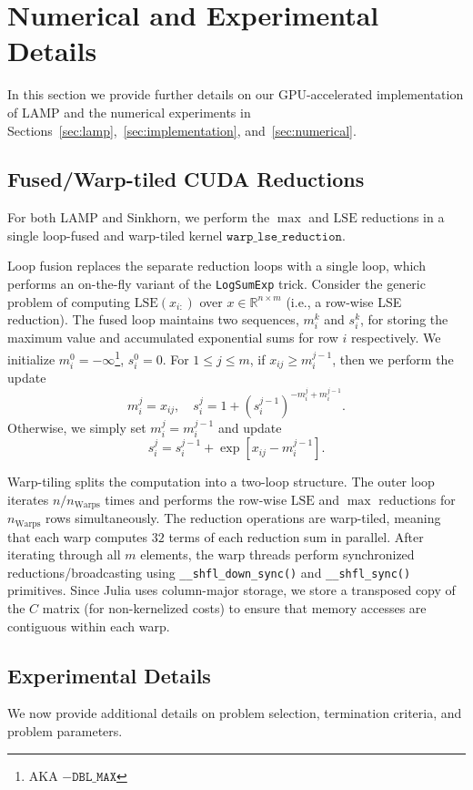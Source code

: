 \documentclass[10pt]{article}
\newcommand{\R}{\mathbb{R}}
\newcommand{\LSE}{\mathrm{LSE}}
\theoremstyle{plain}
\theoremstyle{definition}
\theoremstyle{remark}
\begin{document}
\section{Numerical and Experimental Details}\label{appdx:numerical}
In this section we provide further details on our GPU-accelerated implementation of LAMP and the numerical experiments in Sections~\ref{sec:lamp},~\ref{sec:implementation}, and~\ref{sec:numerical}.

\subsection{Fused/Warp-tiled CUDA Reductions}
For both LAMP and Sinkhorn, we perform the $\max$ and $\LSE$ reductions in a single loop-fused and warp-tiled kernel $\texttt{warp\_lse\_reduction}$. 

Loop fusion replaces the separate reduction loops with a single loop, which performs an on-the-fly variant of the \texttt{LogSumExp} trick. Consider the generic problem of computing $\LSE(x_{i:})$ over $x\in\R^{n\times m}$ (i.e., a row-wise LSE reduction). The fused loop maintains two sequences, $m^k_i$ and $s^k_i$, for storing the maximum value and accumulated exponential sums for row $i$ respectively. We initialize $m^0_i=-\infty$\footnote{AKA $-\texttt{DBL\_MAX}$}, $s^0_i=0$. For $1\leq j\leq m$, if $x_{ij}\geq m_i^{j-1}$, then we perform the update
\[m_i^j=x_{ij},\quad s^j_i=1+(s^{j-1}_i)^{-m_{i}^j+m_i^{j-1}}.\] 
Otherwise, we simply set $m_i^{j}=m_i^{j-1}$ and update
\[s^j_i=s^{j-1}_i+\exp[x_{ij}-m_i^{j-1}].\]

Warp-tiling splits the computation into a two-loop structure. The outer loop iterates $n/n_{\textrm{Warps}}$ times and performs the row-wise $\LSE$ and $\max$ reductions for $n_{\textrm{Warps}}$ rows simultaneously. The reduction operations are warp-tiled, meaning that each warp computes $32$ terms of each reduction sum in parallel. After iterating through all $m$ elements, the warp threads perform synchronized reductions/broadcasting using \texttt{\_\_shfl\_down\_sync()} and \texttt{\_\_shfl\_sync()}  primitives. Since Julia uses column-major storage, we store a transposed copy of the $C$ matrix (for non-kernelized costs) to ensure that memory accesses are contiguous within each warp.

\subsection{Experimental Details}
We now provide additional details on problem selection, termination criteria, and problem parameters.
\end{document}
